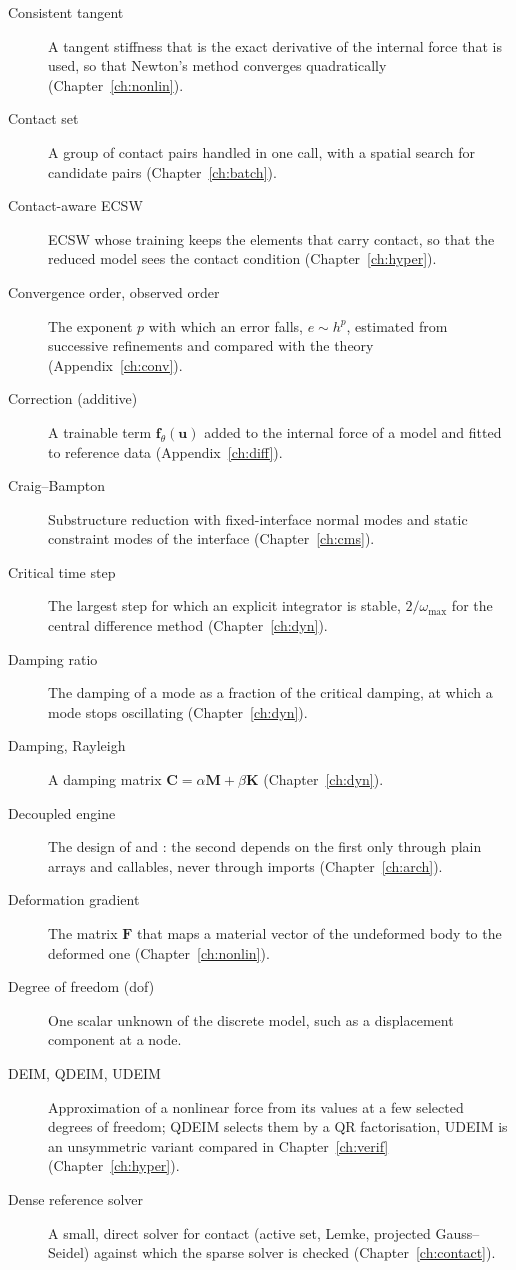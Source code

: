 \begin{description}
\item[Consistent tangent] A tangent stiffness that is the exact derivative of the internal force that is used, so that Newton's method converges quadratically (Chapter~\ref{ch:nonlin}).
\item[Contact set] A group of contact pairs handled in one call, with a spatial search for candidate pairs (Chapter~\ref{ch:batch}).
\item[Contact-aware ECSW] ECSW whose training keeps the elements that carry contact, so that the reduced model sees the contact condition (Chapter~\ref{ch:hyper}).
\item[Convergence order, observed order] The exponent $p$ with which an error falls, $e\sim h^p$, estimated from successive refinements and compared with the theory (Appendix~\ref{ch:conv}).
\item[Correction (additive)] A trainable term $\bm f_\theta(\bm u)$ added to the internal force of a model and fitted to reference data (Appendix~\ref{ch:diff}).
\item[Craig--Bampton] Substructure reduction with fixed-interface normal modes and static constraint modes of the interface (Chapter~\ref{ch:cms}).
\item[Critical time step] The largest step for which an explicit integrator is stable, $2/\omega_{\max}$ for the central difference method (Chapter~\ref{ch:dyn}).
\item[Damping ratio] The damping of a mode as a fraction of the critical damping, at which a mode stops oscillating (Chapter~\ref{ch:dyn}).
\item[Damping, Rayleigh] A damping matrix $\bm C=\alpha\bm M+\beta\bm K$ (Chapter~\ref{ch:dyn}).
\item[Decoupled engine] The design of \fea{} and \rom{}: the second depends on the first only through plain arrays and callables, never through imports (Chapter~\ref{ch:arch}).
\item[Deformation gradient] The matrix $\bm F$ that maps a material vector of the undeformed body to the deformed one (Chapter~\ref{ch:nonlin}).
\item[Degree of freedom (dof)] One scalar unknown of the discrete model, such as a displacement component at a node.
\item[DEIM, QDEIM, UDEIM] Approximation of a nonlinear force from its values at a few selected degrees of freedom; QDEIM selects them by a QR factorisation, UDEIM is an unsymmetric variant compared in Chapter~\ref{ch:verif} (Chapter~\ref{ch:hyper}).
\item[Dense reference solver] A small, direct solver for contact (active set, Lemke, projected Gauss--Seidel) against which the sparse solver is checked (Chapter~\ref{ch:contact}).

\end{description}
